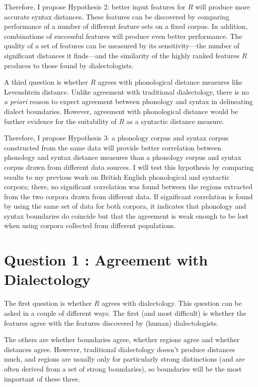 Therefore, I propose Hypothesis 2: better input features
for $R$ will produce more accurate syntax
distances. These features can be discovered by comparing performance
of a number of different feature sets on a fixed corpus. In addition,
combinations of successful features will produce even better
performance.
The quality of a set of features can be
measured by its sensitivity---the number of significant distances it
finds---and the similarity of the highly ranked features $R$ produces
to those found by dialectologists.

A third question is whether $R$ agrees with phonological distance
measures like Levenshtein distance. Unlike agreement with traditional
dialectology, there is no {\it a priori} reason to expect agreement
between phonology and syntax in delineating dialect
boundaries. However, agreement with phonological distance would be
further evidence for the suitability of $R$ as a syntactic distance
measure.

Therefore, I propose Hypothesis 3: a phonology corpus and syntax corpus
constructed from the same data will provide better correlation between
phonology and syntax distance measures than a phonology corpus and
syntax corpus drawn from different data sources. I will test this
hypothesis by comparing results to my previous work on British English
phonological and syntactic corpora; there, no significant correlation
was found between the regions extracted from the two corpora drawn
from different data. If significant correlation is found by using the
same set of data for both corpora, it indicates that phonology and
syntax boundaries do coincide but that the agreement is weak enough to
be lost when using corpora collected from different populations.

\section{Question 1 : Agreement with Dialectology}

The first question is whether $R$ agrees with dialectology. This
question can be asked in a couple of different ways. The first (and
most difficult) is whether the features agree with the features
discovered by (human) dialectologists.

The others are whether boundaries agree, whether regions agree and
whether distances agree. However, traditional dialectology doesn't
produce distances much, and regions are usually only for particularly
strong distinctions (and are often derived from a set of strong
boundaries), so boundaries will be the most important of these
three.

